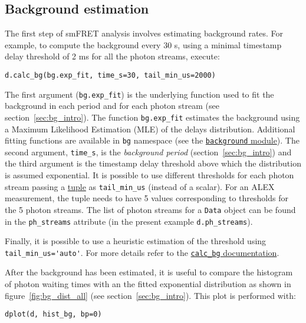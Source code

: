 \subsection{Background estimation}
\label{sec:bg_calc}

The first step of smFRET analysis involves estimating background rates.
For example, to compute the background every 30 s, using a minimal timestamp
delay threshold of 2 ms for all the photon streams, execute:

\begin{verbatim}
d.calc_bg(bg.exp_fit, time_s=30, tail_min_us=2000)
\end{verbatim}

The first argument (\verb|bg.exp_fit|) is the underlying function used to fit the
background in each period and for each photon stream (see section~\ref{sec:bg_intro}).
The function
\verb|bg.exp_fit| estimates the background using a Maximum Likelihood Estimation
(MLE) of the delays distribution. Additional fitting functions are available in
\verb|bg| namespace (see the
\href{http://fretbursts.readthedocs.org/en/latest/background.html}
{\texttt{background} module}). The second argument, \verb|time_s|, is the
\textit{background period} (section~\ref{sec:bg_intro}) and the third argument
is the timestamp delay threshold above which the distribution is assumed exponential.
It is possible to use different thresholds
for each photon stream passing a
\href{https://docs.python.org/2/tutorial/datastructures.html#tuples-and-sequences}{tuple}
as \verb|tail_min_us| (instead of a scalar).
For an ALEX measurement, the tuple needs to have 5 values
corresponding to thresholds for the 5 photon streams. The list of photon
streams for a \verb|Data| object can be found in the \verb|ph_streams|
attribute (in the present example \verb|d.ph_streams|).

Finally, it is possible to use a heuristic estimation of the threshold using
\verb|tail_min_us='auto'|. For more details refer to the
\href{http://fretbursts.readthedocs.org/en/latest/data\_class.html#fretbursts.burstlib.Data.calc\_bg}{\texttt{calc\_bg} documentation}.

After the background has been estimated, it is useful to compare the histogram of 
photon waiting times with an the fitted exponential distribution as shown in figure~\ref{fig:bg_dist_all}
(see section~\ref{sec:bg_intro}). This plot is performed with:

\begin{verbatim}
dplot(d, hist_bg, bp=0)
\end{verbatim}

